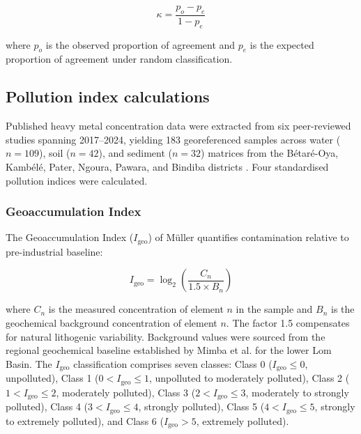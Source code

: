 \documentclass[preprint,12pt,number]{elsarticle}
\begin{document}
\begin{equation}
\kappa = \frac{p_o - p_e}{1 - p_e}
\label{eq:kappa}
\end{equation}

\noindent where $p_o$ is the observed proportion of agreement and $p_e$ is the expected proportion of agreement under random classification.


\subsection{Pollution index calculations}

Published heavy metal concentration data were extracted from six peer-reviewed studies spanning 2017--2024, yielding 183 georeferenced samples across water ($n = 109$), soil ($n = 42$), and sediment ($n = 32$) matrices from the B\'{e}tar\'{e}-Oya, Kamb\'{e}l\'{e}, Pater, Ngoura, Pawara, and Bindiba districts \cite{Rakotondrabe2017, Rakotondrabe2018, NgoaManga2024, Fonshiynwa2024, Dallou2018, Fodoue2022, Edjengte2023}. Four standardised pollution indices were calculated.

\subsubsection{Geoaccumulation Index}

The Geoaccumulation Index ($I_\text{geo}$) of M\"{u}ller \cite{Muller1969} quantifies contamination relative to pre-industrial baseline:

\begin{equation}
I_\text{geo} = \log_2 \left(\frac{C_n}{1.5 \times B_n}\right)
\label{eq:igeo}
\end{equation}

\noindent where $C_n$ is the measured concentration of element $n$ in the sample and $B_n$ is the geochemical background concentration of element $n$. The factor 1.5 compensates for natural lithogenic variability. Background values were sourced from the regional geochemical baseline established by Mimba et al. \cite{Mimba2018} for the lower Lom Basin. The $I_\text{geo}$ classification comprises seven classes: Class 0 ($I_\text{geo} \leq 0$, unpolluted), Class 1 ($0 < I_\text{geo} \leq 1$, unpolluted to moderately polluted), Class 2 ($1 < I_\text{geo} \leq 2$, moderately polluted), Class 3 ($2 < I_\text{geo} \leq 3$, moderately to strongly polluted), Class 4 ($3 < I_\text{geo} \leq 4$, strongly polluted), Class 5 ($4 < I_\text{geo} \leq 5$, strongly to extremely polluted), and Class 6 ($I_\text{geo} > 5$, extremely polluted).
\end{document}
